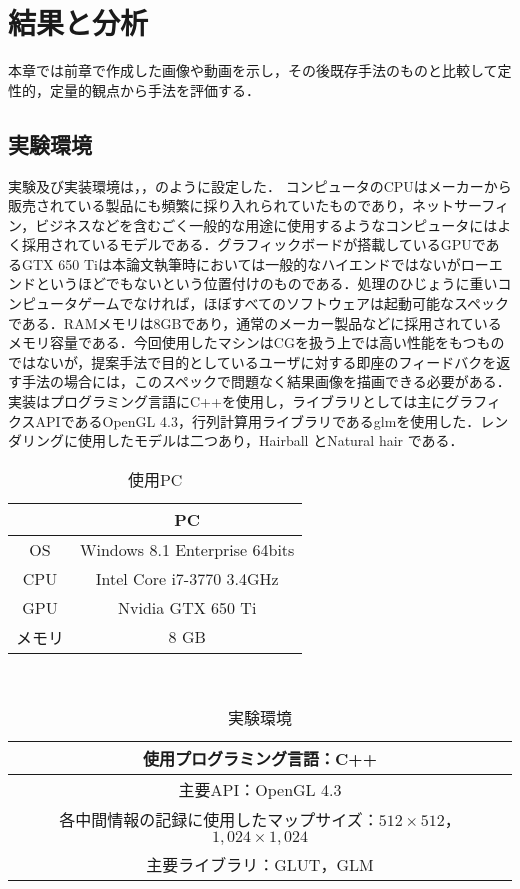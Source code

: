 \chapter{結果と分析}
\label{chap:results}
本章では前章で作成した画像や動画を示し，その後既存手法のものと比較して定性的，定量的観点から手法を評価する．
\section{実験環境}
実験及び実装環境は，，のように設定した．
コンピュータのCPUはメーカーから販売されている製品にも頻繁に採り入れられていたものであり，ネットサーフィン，ビジネスなどを含むごく一般的な用途に使用するようなコンピュータにはよく採用されているモデルである．グラフィックボードが搭載しているGPUであるGTX 650 Tiは本論文執筆時においては一般的なハイエンドではないがローエンドというほどでもないという位置付けのものである．処理のひじょうに重いコンピュータゲームでなければ，ほぼすべてのソフトウェアは起動可能なスペックである．RAMメモリは8GBであり，通常のメーカー製品などに採用されているメモリ容量である．今回使用したマシンはCGを扱う上では高い性能をもつものではないが，提案手法で目的としているユーザに対する即座のフィードバクを返す手法の場合には，このスペックで問題なく結果画像を描画できる必要がある．実装はプログラミング言語にC++を使用し，ライブラリとしては主にグラフィクスAPIであるOpenGL 4.3，行列計算用ライブラリであるglmを使用した．レンダリングに使用したモデルは二つあり，Hairball \cite{hairball}とNatural hair \cite{hairmodel}である．
\begin{table}[h]
\centering
    \caption{使用PC}
    \begin{tabular}{|c|c|} \hline
        & PC \\ \hline \hline
        OS & Windows 8.1 Enterprise 64bits \\ \hline
        CPU & Intel Core i7-3770 3.4GHz \\ \hline
        GPU & Nvidia GTX 650 Ti \\ \hline
        メモリ & 8 GB \\ \hline
    \end{tabular}
    \label{tab:pc}
\end{table}\\
\begin{table}[h]
\centering
    \caption{実験環境}
    \begin{tabular}{|c|} \hline
        使用プログラミング言語：C++\\ \hline
        主要API：OpenGL 4.3\\ \hline
        各中間情報の記録に使用したマップサイズ：$512\times512$，$1,024\times1,024$\\ \hline
        主要ライブラリ：GLUT，GLM\\ \hline
    \end{tabular}
    \label{tab:environment}
\end{table}\\

